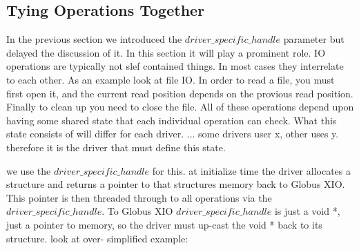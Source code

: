 \documentclass[11pt]{article}
\begin{document}
\subsection{Tying Operations Together}
In the previous section we introduced the $driver\_specific\_handle$ parameter
but delayed the discussion of it.  In this section it will play a 
prominent role.  IO operations are typically not slef contained things.
In most cases they interrelate to each other.  As an example look at file
IO.  In order to read a file, you must first open it, and the current
read position depends on the provious read position.  Finally to clean up
you need to close the file.  All of these operations depend upon having some
shared state that each individual operation can check.  What this state
consists of will differ for each driver.  ...
some drivers user x, other uses y.  therefore it is the driver that must 
define this state.

we use the $driver\_specific\_handle$ for this.  at initialize time the
driver allocates a structure and returns a pointer to that structures
memory back to Globus XIO.  This pointer is then threaded through to all
operations via the $driver\_specific\_handle$.  To Globus XIO
$driver\_specific\_handle$ is just a void *, just a pointer to memory, so 
the driver must up-cast the void * back to its structure.  look at over-
simplified example:
\end{document}
